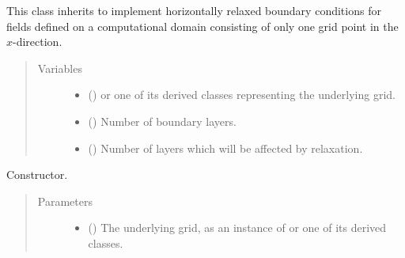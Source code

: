 \documentclass[letterpaper,10pt,english]{sphinxmanual}
\begin{document}

\begin{fulllineitems}
\label{\detokenize{api:tasmania.dycore.horizontal_boundary_relaxed.RelaxedYZ}}
This class inherits {\hyperref[\detokenize{api:tasmania.dycore.horizontal_boundary.HorizontalBoundary}]{}} to implement horizontally
relaxed boundary conditions for fields defined on a computational domain consisting of only one grid point
in the \(x\)-direction.
\begin{quote}\begin{description}
\item[{Variables}] \leavevmode\begin{itemize}
\item {} 
 () \textendash{} {\hyperref[\detokenize{api:tasmania.grids.grid_xyz.GridXYZ}]{}} or one of its derived classes representing the underlying grid.

\item {} 
{\hyperref[\detokenize{api:tasmania.dycore.prognostic_isentropic.PrognosticIsentropic.nb}]{}} () \textendash{} Number of boundary layers.

\item {} 
 () \textendash{} Number of layers which will be affected by relaxation.

\end{itemize}

\end{description}\end{quote}

\begin{fulllineitems}
\label{\detokenize{api:tasmania.dycore.horizontal_boundary_relaxed.RelaxedYZ.__init__}}
Constructor.
\begin{quote}\begin{description}
\item[{Parameters}] \leavevmode\begin{itemize}
\item {} 
 () \textendash{} The underlying grid, as an instance of {\hyperref[\detokenize{api:tasmania.grids.grid_xyz.GridXYZ}]{}} or one of its derived classes.


\end{itemize}
\end{description}
\end{quote}
\end{fulllineitems}
\end{fulllineitems}
\end{document}
